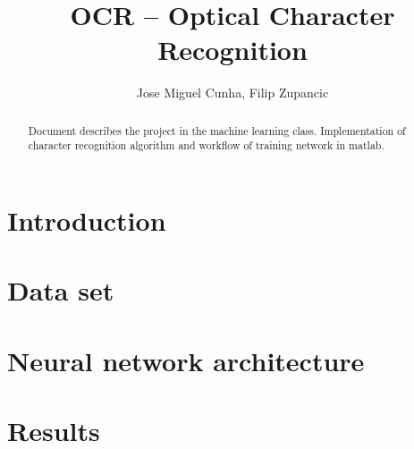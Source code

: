 \documentclass[A4]{article}
\begin{document}
\title{OCR – Optical Character Recognition}
\author{Jose Miguel Cunha, Filip Zupancic}
\maketitle

\begin{abstract}
Document describes the project in the machine learning class. Implementation of character recognition algorithm and workflow of training network in matlab.  
\end{abstract}

\tableofcontents

\section{Introduction}

\section{Data set}

\section{Neural network architecture}

\section{Results}
\end{document}
